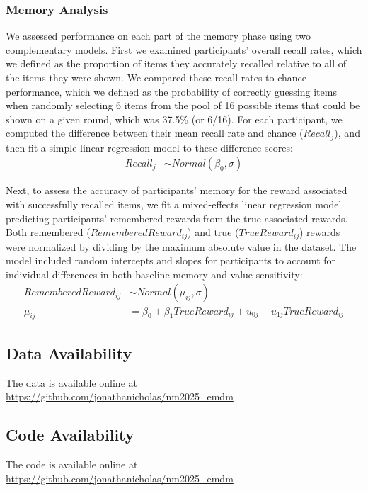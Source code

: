 \documentclass[10pt,letterpaper]{article}
\begin{document}
\subsubsection{Memory Analysis}

We assessed performance on each part of the memory phase using two complementary models. First we examined participants' overall recall rates, which we defined as the proportion of items they accurately recalled relative to all of the items they were shown. We compared these recall rates to chance performance, which we defined as the probability of correctly guessing items when randomly selecting 6 items from the pool of 16 possible items that could be shown on a given round, which was 37.5\% (or 6/16). For each participant, we computed the difference between their mean recall rate and chance ($Recall_j$), and then fit a simple linear regression model to these difference scores:
\begin{align*}
Recall_j &\sim Normal(\beta_0, \sigma)
\end{align*}

Next, to assess the accuracy of participants' memory for the reward associated with successfully recalled items, we fit a mixed-effects linear regression model predicting participants' remembered rewards from the true associated rewards. Both remembered ($RememberedReward_{ij}$) and true ($TrueReward_{ij}$) rewards were normalized by dividing by the maximum absolute value in the dataset. The model included random intercepts and slopes for participants to account for individual differences in both baseline memory and value sensitivity:
\begin{align*}
RememberedReward_{ij} &\sim Normal(\mu_{ij}, \sigma) \\
\mu_{ij} &= \beta_0 + \beta_1TrueReward_{ij} \nonumber + u_{0j} + u_{1j}TrueReward_{ij}
\end{align*}

\subsection{Data Availability}
The data is available online at \url{https://github.com/jonathanicholas/nm2025_emdm}

\subsection{Code Availability}
The code is available online at \url{https://github.com/jonathanicholas/nm2025_emdm}
\end{document}
